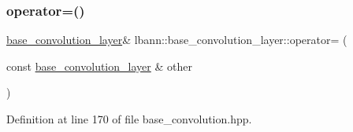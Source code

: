 \subsubsection{\texorpdfstring{operator=()}{operator=()}}
{\footnotesize\ttfamily \hyperlink{classlbann_1_1base__convolution__layer}{base\+\_\+convolution\+\_\+layer}\& lbann\+::base\+\_\+convolution\+\_\+layer\+::operator= (\begin{DoxyParamCaption}\item[{const \hyperlink{classlbann_1_1base__convolution__layer}{base\+\_\+convolution\+\_\+layer} \&}]{other }\end{DoxyParamCaption})\hspace{0.3cm}{\ttfamily [inline]}}



Definition at line 170 of file base\+\_\+convolution.\+hpp.


